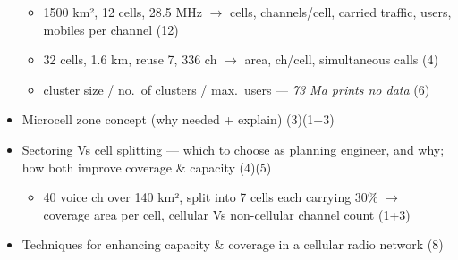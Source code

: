 \documentclass[10pt]{article}
\begin{document}
\begin{multicols}{2}
\begin{itemize}
\begin{itemize}
      \item 1500 km², 12 cells, 28.5 MHz $\rightarrow$ cells, channels/cell, carried traffic, users, mobiles per channel \hfill (12)
      \item 32 cells, 1.6 km, reuse 7, 336 ch $\rightarrow$ area, ch/cell, simultaneous calls \hfill (4)
      \item cluster size / no.\ of clusters / max.\ users --- \emph{73 Ma prints no data} \hfill (6)
    \end{itemize}
  \item Microcell zone concept (why needed + explain) \hfill (3)(1+3)
  \item Sectoring Vs cell splitting --- which to choose as planning engineer, and why; how both improve coverage \& capacity \hfill (4)(5)
    \begin{itemize}
      \item 40 voice ch over 140 km², split into 7 cells each carrying 30\% $\rightarrow$ coverage area per cell, cellular Vs non-cellular channel count \hfill (1+3)
    \end{itemize}
  \item Techniques for enhancing capacity \& coverage in a cellular radio network \hfill (8)
\end{itemize}


\end{multicols}
\end{document}
